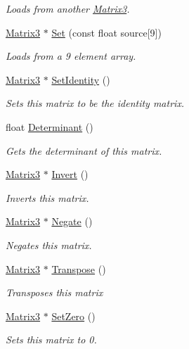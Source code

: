 \begin{DoxyCompactItemize}
\begin{DoxyCompactList}\small\item\em Loads from another \hyperlink{class_flounder_1_1_matrix3}{Matrix3}. \end{DoxyCompactList}\item 
\hyperlink{class_flounder_1_1_matrix3}{Matrix3} $\ast$ \hyperlink{class_flounder_1_1_matrix3_a07183169be41a48a950d8de7649a3346}{Set} (const float source\mbox{[}9\mbox{]})
\begin{DoxyCompactList}\small\item\em Loads from a 9 element array. \end{DoxyCompactList}\item 
\hyperlink{class_flounder_1_1_matrix3}{Matrix3} $\ast$ \hyperlink{class_flounder_1_1_matrix3_a518acfa7508d099ceb8eb298cdec0b35}{Set\+Identity} ()
\begin{DoxyCompactList}\small\item\em Sets this matrix to be the identity matrix. \end{DoxyCompactList}\item 
float \hyperlink{class_flounder_1_1_matrix3_a5f689731d7c07d73e4dd95cce63d498f}{Determinant} ()
\begin{DoxyCompactList}\small\item\em Gets the determinant of this matrix. \end{DoxyCompactList}\item 
\hyperlink{class_flounder_1_1_matrix3}{Matrix3} $\ast$ \hyperlink{class_flounder_1_1_matrix3_a56c101bb989a3241a624ccfec4d2a493}{Invert} ()
\begin{DoxyCompactList}\small\item\em Inverts this matrix. \end{DoxyCompactList}\item 
\hyperlink{class_flounder_1_1_matrix3}{Matrix3} $\ast$ \hyperlink{class_flounder_1_1_matrix3_a8110c5ef69eceb2ed7f39fc26ee2e40f}{Negate} ()
\begin{DoxyCompactList}\small\item\em Negates this matrix. \end{DoxyCompactList}\item 
\hyperlink{class_flounder_1_1_matrix3}{Matrix3} $\ast$ \hyperlink{class_flounder_1_1_matrix3_a45ca13f33f753b24b03ae557542167d5}{Transpose} ()
\begin{DoxyCompactList}\small\item\em Transposes this matrix \end{DoxyCompactList}\item 
\hyperlink{class_flounder_1_1_matrix3}{Matrix3} $\ast$ \hyperlink{class_flounder_1_1_matrix3_a9de63d832e809ecac5b97c3cea038598}{Set\+Zero} ()
\begin{DoxyCompactList}\small\item\em Sets this matrix to 0. \end{DoxyCompactList}\end{DoxyCompactItemize}
